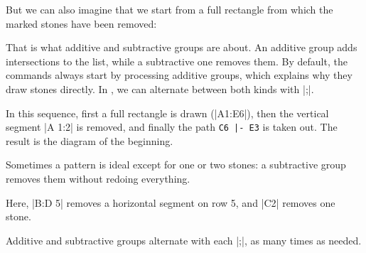 But we can also imagine that we start from a full rectangle from which the marked stones have been removed:

\begin{figure}[H]
	\centering
	\begin{goban}
	\end{goban}
\end{figure}

That is what additive and subtractive groups are about. An additive group adds intersections to the list, while a subtractive one removes them. By default, the commands always start by processing additive groups, which explains why they draw stones directly. In \pgfgoname, we can alternate between both kinds with |;|.

\begin{codeexample}[width=6cm]
	\begin{goban}[label = {at = all}, partial = A1:E6]
	\end{goban}

	\begin{goban}[label = {at = all}, partial = A1:E6]
	\end{goban}

	\begin{goban}[label = {at = all}, partial = A1:E6]
	\end{goban}
\end{codeexample}

In this sequence, first a full rectangle is drawn (|A1:E6|), then the vertical segment |A 1:2| is removed, and finally the path \verb+C6 |- E3+ is taken out. The result is the diagram of the beginning.

Sometimes a pattern is ideal except for one or two stones: a subtractive group removes them without redoing everything.

\begin{codeexample}[width=6cm]
	\begin{goban}[label = {at = all}]
		\stones[b]{A1:E6; B:D 5, C2}
	\end{goban}
\end{codeexample}

Here, |B:D 5| removes a horizontal segment on row 5, and |C2| removes one stone.

Additive and subtractive groups alternate with each |;|, as many times as needed.


